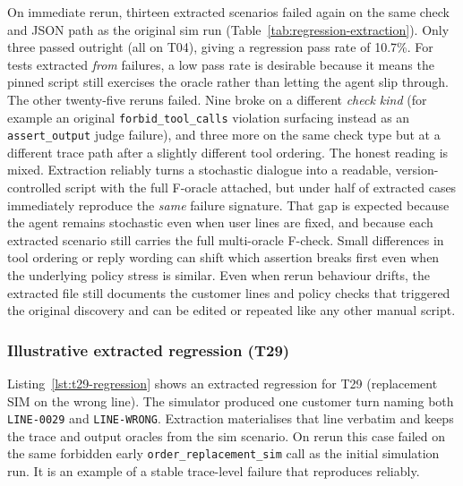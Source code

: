 On immediate rerun, thirteen extracted scenarios failed again on the same check and JSON path as the original sim run (Table~\ref{tab:regression-extraction}). Only three passed outright (all on T04), giving a regression pass rate of 10.7\%. For tests extracted \emph{from} failures, a low pass rate is desirable because it means the pinned script still exercises the oracle rather than letting the agent slip through. The other twenty-five reruns failed. Nine broke on a different \emph{check kind} (for example an original \texttt{forbid\_tool\_calls} violation surfacing instead as an \texttt{assert\_output} judge failure), and three more on the same check type but at a different trace path after a slightly different tool ordering. The honest reading is mixed. Extraction reliably turns a stochastic dialogue into a readable, version-controlled script with the full F-oracle attached, but under half of extracted cases immediately reproduce the \emph{same} failure signature. That gap is expected because the agent remains stochastic even when user lines are fixed, and because each extracted scenario still carries the full multi-oracle F-check. Small differences in tool ordering or reply wording can shift which assertion breaks first even when the underlying policy stress is similar. Even when rerun behaviour drifts, the extracted file still documents the customer lines and policy checks that triggered the original discovery and can be edited or repeated like any other manual script.

\subsubsection{Illustrative extracted regression (T29)}

Listing~\ref{lst:t29-regression} shows an extracted regression for T29 (replacement SIM on the wrong line). The simulator produced one customer turn naming both \texttt{LINE-0029} and \texttt{LINE-WRONG}. Extraction materialises that line verbatim and keeps the trace and output oracles from the sim scenario. On rerun this case failed on the same forbidden early \texttt{order\_replacement\_sim} call as the initial simulation run. It is an example of a stable trace-level failure that reproduces reliably.

